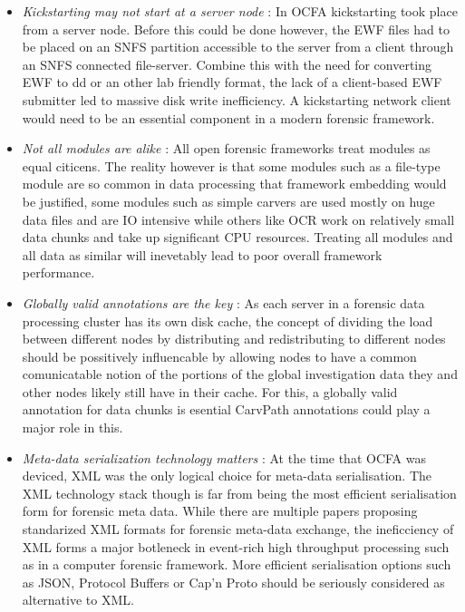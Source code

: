 \begin{itemize}
\item \emph{Kickstarting may not start at a server node} : In OCFA kickstarting took place from a server node. Before this could be done however, the EWF files had to be placed on an SNFS partition accessible to the server from a client through an SNFS connected file-server. Combine this with the need for converting EWF to dd or an other lab friendly format, the lack of a client-based EWF submitter led to massive disk write inefficiency. A kickstarting network client would need to be an essential component in a modern forensic framework.
\item \emph{Not all modules are alike} : All open forensic frameworks treat modules as equal citicens. The reality however is that some modules such as a file-type module are so common in data processing that framework embedding would be justified, some modules such as simple carvers are used mostly on huge data files and are IO intensive while others like OCR work on relatively small data chunks and take up significant CPU resources. Treating all modules and all data as similar will inevetably lead to poor overall framework performance. 
\item \emph{Globally valid annotations are the key} : As each server in a forensic data processing cluster has its own disk cache, the concept of dividing the load between different nodes by distributing and redistributing to different nodes should be possitively influencable by allowing nodes to have a common comunicatable notion of the portions of the global investigation data they and other nodes likely still have in their cache. For this, a globally valid annotation for data chunks is esential CarvPath annotations could play a major role in this.
\item \emph{Meta-data serialization technology matters} : At the time that OCFA was deviced, XML was the only logical choice for meta-data serialisation. The XML technology stack though is far from being the most efficient serialisation form for forensic meta data. While there are multiple papers proposing standarized XML formats for forensic meta-data exchange, the ineficciency of XML forms a major botleneck in event-rich high throughput processing such as in a computer forensic framework. More efficient serialisation options such as JSON, Protocol Buffers or Cap'n Proto should be seriously considered as alternative to XML. 

\end{itemize}
